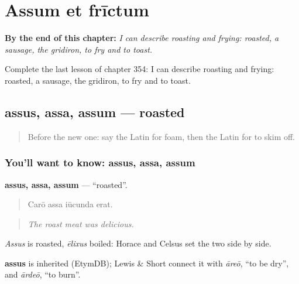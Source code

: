 
\chapter{Assum et frīctum}
\label{ch:la-assum-et-frictum}

\begin{chapteropening}
\textbf{By the end of this chapter:} \emph{I can describe roasting and frying: roasted, a sausage, the gridiron, to fry and to toast.}

Complete the last lesson of chapter 354: I can describe roasting and frying: roasted, a sausage, the gridiron, to fry and to toast.
\end{chapteropening}

\section[assus, assa, assum]{assus, assa, assum — roasted}

\label{lesson:LA-C354-assus}



\begin{quote}
Before the new one: say the Latin for foam, then the Latin for to skim off.
\end{quote}

\subsection*{You'll want to know: assus, assa, assum}
\textbf{assus, assa, assum} — \textquotedblleft{}roasted\textquotedblright{}.

\begin{quote}
Carō assa iūcunda erat.
\end{quote}

\begin{quote}
\emph{The roast meat was delicious.}
\end{quote}

\emph{Assus} is roasted, \emph{ēlixus} boiled: Horace and Celsus set the two side by side.

\begin{cousinweb}
\textbf{assus} is inherited (EtymDB); Lewis \& Short connect it with \emph{āreō}, \textquotedblleft{}to be dry\textquotedblright{}, and \emph{ārdeō}, \textquotedblleft{}to burn\textquotedblright{}.
\end{cousinweb}

